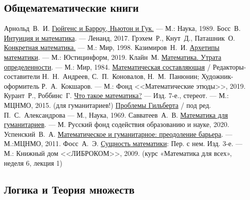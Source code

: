\documentclass[11pt]{book}
\theoremstyle{mythm}
\theoremstyle{mydef}
\numberwithin{upr}{chapter}
\begin{document}
\renewcommand\bibname{Список литературы}
\begin{thebibliography}{199}
\addcontentsline{toc}{chapter}{\bibname}

\subsection*{Общематематические книги}

 Арнольд~В.~И. \href{http://ilib.mccme.ru/djvu/arnold/ngbg.djvu?djvuopts&page=6}{Гюйгенс и Барроу, Ньютон и Гук.} --- М.: Наука, 1989.
 Босс~В. \href{https://booksee.org/book/467231}{Интуиция и математика}. --- Ленанд, 2017.
 Грэхем~Р., Кнут~Д., Паташник~О. \href{https://may.alleng.org/d/math/math163.htm}{Конкретная математика.} --- М.: Мир, 1998.
 Казимиров~Н.~И. \href{https://mathem.at}{Архетипы математики}. --- М.: Юстицинформ, 2019.
 Клайн~М. \href{http://vekordija.narod.ru/R-KLINE1.PDF}{Математика. Утрата определенности}. --- М.: Мир, 1984.
 \href{https://book.etudes.ru/}{Математическая составляющая} / Редакторы-составители Н.~Н.~Андреев, С.~П.~Коновалов, Н.~М.~Панюнин; Художник-оформитель Р.~А.~Кокшаров. --- М.: Фонд <<Мате­мати­ческие этюды>>, 2019.
 Курант~Р., Роббинс~Г. \href{http://ilib.mccme.ru/pdf/kurant.pdf}{Что такое математика?} --- Изд. 7-е., стереот. --- М.: МЦНМО, 2015. (для гуманитариев!)
 \href{https://math.ru/lib/377}{Проблемы Гильберта} / под ред. П.~С.~Александрова --- М., Наука, 1969.
 Савватеев~А.~В. \href{https://savvateev.xyz/media/savva-book-new.pdf}{Математика для гуманитариев}. --- М. Русский фонд содействия образованию и науке, 2020.
 Успенский~В.~А. \href{https://mccme.ru/free-books/uspenskii2/uspensky.pdf}{Математическое и гуманитарное: преодоление барьера}. --- М.:МЦНМО, 2011.
 Фосс~А.~Э. \href{https://obuchalka.org/2014051577400/suschnost-matematiki-foss-aurel-edmund-2009.html}{Сущность математики}: Пер. с нем. Изд. 3-е. --- М.: Книжный дом <<ЛИБРОКОМ>>, 2009. (курс «Математика для всех», неделя 6, лекция 1)

\subsection*{Логика и Теория множеств}


\end{thebibliography}
\end{document}
